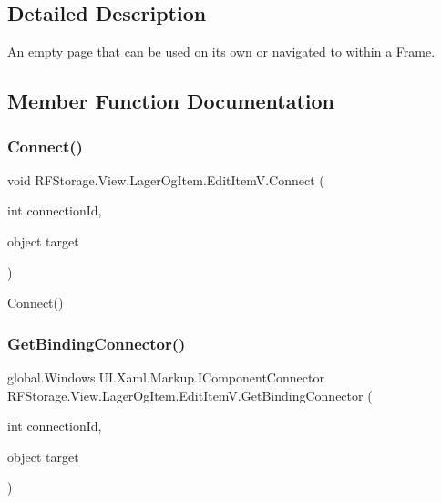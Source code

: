 \subsection{Detailed Description}
An empty page that can be used on its own or navigated to within a Frame. 



\subsection{Member Function Documentation}
\mbox{\label{class_r_f_storage_1_1_view_1_1_lager_og_item_1_1_edit_item_v_acf13e2375360817031b7c2aad669eb5f}} 
\subsubsection{\texorpdfstring{Connect()}{Connect()}}
{\footnotesize\ttfamily void R\+F\+Storage.\+View.\+Lager\+Og\+Item.\+Edit\+Item\+V.\+Connect (\begin{DoxyParamCaption}\item[{int}]{connection\+Id,  }\item[{object}]{target }\end{DoxyParamCaption})}



\mbox{\hyperlink{class_r_f_storage_1_1_view_1_1_lager_og_item_1_1_edit_item_v_acf13e2375360817031b7c2aad669eb5f}{Connect()}} 

\mbox{\label{class_r_f_storage_1_1_view_1_1_lager_og_item_1_1_edit_item_v_a4b7cae61d2ae50e049e152a2f24d71d9}} 
\subsubsection{\texorpdfstring{GetBindingConnector()}{GetBindingConnector()}}
{\footnotesize\ttfamily global.\+Windows.\+U\+I.\+Xaml.\+Markup.\+I\+Component\+Connector R\+F\+Storage.\+View.\+Lager\+Og\+Item.\+Edit\+Item\+V.\+Get\+Binding\+Connector (\begin{DoxyParamCaption}\item[{int}]{connection\+Id,  }\item[{object}]{target }\end{DoxyParamCaption})}



